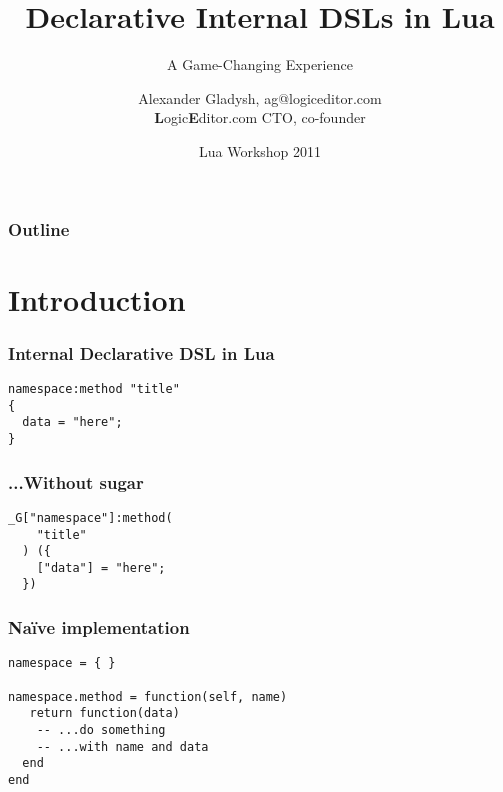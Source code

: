 \documentclass[handout]{beamer}
\title{Declarative Internal DSLs in Lua}
\subtitle{A Game-Changing Experience}
\author{Alexander Gladysh, ag@logiceditor.com\\\textbf{L}ogic\textbf{E}ditor.com CTO, co-founder}
\date{Lua Workshop 2011}
\begin{document}
\maketitle


\begin{frame}

\frametitle{Outline}

\tableofcontents

\end{frame}


\section{Introduction}


\begin{frame}[fragile]

\frametitle{Internal Declarative DSL in Lua}

\begin{verbatim}
namespace:method "title"
{
  data = "here";
}
\end{verbatim}

\end{frame}


\begin{frame}[fragile]

\frametitle{...Without sugar}

\begin{verbatim}
_G["namespace"]:method(
    "title"
  ) ({
    ["data"] = "here";
  })
\end{verbatim}

\end{frame}


\begin{frame}[fragile]

\frametitle{Naïve implementation}

\begin{verbatim}
namespace = { }

namespace.method = function(self, name)
   return function(data)
    -- ...do something
    -- ...with name and data
  end
end
\end{verbatim}

\end{frame}
\end{document}
